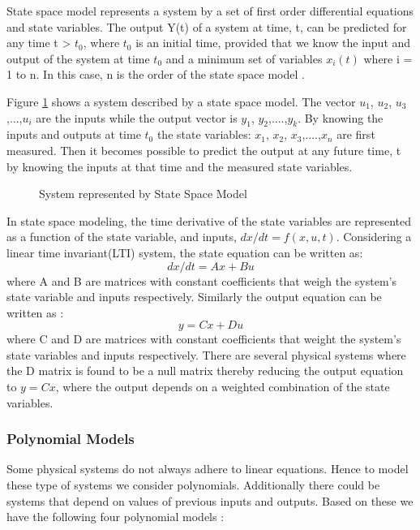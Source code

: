 \documentclass[article,type=msc,colorback,12pt,accentcolor=tud8b,table]{tudthesis}
\begin{document}
State space model represents a system by a set of first order differential equations and state variables. The output Y(t) of a system at time, t, can be predicted for any time t > $t_0$,  where $t_0$ is an initial time, provided that we know the input and output of the system at time $t_0$ and a minimum set of variables $x_i(t)$ where i = 1 to n. In this case, n is the order of the state space model \cite{ljung1987system}. 

Figure \ref{fig:state_space_model} shows a system described by a state space model. The vector $u_1$, $u_2$, $u_3$,...,$u_i$ are the inputs while the output vector is $y_1$, $y_2$,....,$y_k$. By knowing the inputs and outputs at time $t_0$ the state variables: $x_1$, $x_2$, $x_3$,....,$x_n$ are first measured. Then it becomes possible to predict the output at any future time, t by knowing the inputs at that time and the measured state variables.

 \begin{figure}
 \begin{center}
  \makebox[\textwidth]{\texttt{[image: B6]}}
\end{center}
\caption{System represented by State Space Model}
\label{fig:state_space_model}
\end{figure}

In state space modeling, the time derivative of the state variables are represented as a function of the state variable, and inputs, $dx/dt = f(x,u,t)$. Considering a linear time invariant(LTI) system, the state equation can be written as\cite{ljung1987system}: $$ dx/dt = Ax + Bu $$ where A and B are matrices with constant coefficients that weigh the system's state variable and inputs respectively. Similarly the output equation can be written as \cite{ljung1987system}: $$ y = Cx + Du $$ where C and D are matrices with constant coefficients that weight the system's state variables and inputs respectively. There are several physical systems where the D matrix is found to be a null matrix thereby reducing the output equation to $ y = Cx $, where the output depends on a weighted combination of the state variables.

\subsubsection{Polynomial Models}
	
	Some physical systems do not always adhere to linear equations. Hence to model these type of systems we consider polynomials. Additionally there could be systems that depend on values of previous inputs and outputs. Based on these we have the following four polynomial models \cite{ljung1998system, ljung1999system}:
	
\end{document}
